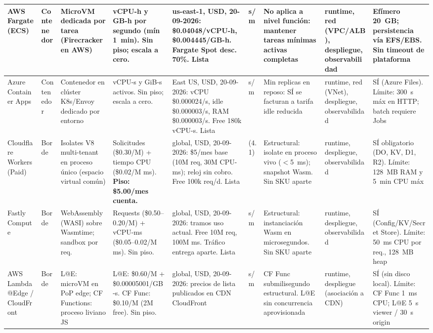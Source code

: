 \documentclass[12pt, letterpaper, table, xcdraw]{inf-pucv}
\begin{document}
\begin{landscape}
{\begin{longtable}{|p{2.1cm}|p{1.6cm}|p{2.4cm}|p{2.8cm}|p{3.1cm}|p{1.0cm}|p{2.1cm}|p{2.6cm}|p{2.8cm}|}
AWS Fargate (ECS) & Contenedor & MicroVM dedicada por tarea (Firecracker en AWS) & vCPU-h y GB-h por segundo (mín 1~min). Sin piso; escala a cero. & us-east-1, USD, 20-09-2026: \$0.04048/vCPU-h, \$0.004445/GB-h. Fargate Spot desc. 70\%. Lista & s/m & No aplica a nivel función: mantener tareas mínimas activas completas & runtime, red (VPC/ALB), despliegue, observabilidad & Efímero 20~GB; persistencia vía EFS/EBS. Sin timeout de plataforma \\ \hline

Azure Container Apps & Contenedor & Contenedor en clúster K8s/Envoy dedicado por entorno & vCPU-s y GiB-s activos. Sin piso; escala a cero. & East US, USD, 20-09-2026: vCPU \$0.000024/s, idle \$0.000003/s, RAM \$0.000003/s. Free 180k vCPU-s. Lista & s/m & Min replicas en reposo: SÍ se facturan a tarifa idle reducida & runtime, red (VNet), despliegue, observabilidad & SÍ (Azure Files). Límite: 300~s máx en HTTP; batch requiere Jobs \\ \hline

Cloudflare Workers (Paid) & Borde & Isolates V8 multi-tenant en proceso único (espacio virtual común) & Solicitudes (\$0.30/M) + tiempo CPU (\$0.02/M ms). \textbf{Piso: \$5.00/mes cuenta.} & global, USD, 20-09-2026: \$5/mes base (10M req, 30M CPU-ms); reloj sin cobro. Free 100k req/d. Lista & (4.1) & Estructural: isolate en proceso vivo ($<$5~ms); snapshot Wasm. Sin SKU aparte & runtime, despliegue, observabilidad & SÍ obligatorio (DO, KV, D1, R2). Límite: 128~MB RAM y 5~min CPU máx \\ \hline

Fastly Compute & Borde & WebAssembly (WASI) sobre Wasmtime; sandbox por req. & Requests (\$0.50--0.20/M) + vCPU-ms (\$0.05--0.02/M ms). Sin piso. & global, USD, 20-09-2026: tramos uso actual. Free 10M req, 100M ms. Tráfico entrega aparte. Lista & s/m & Estructural: instanciación Wasm en microsegundos. Sin SKU aparte & runtime, despliegue, observabilidad & SÍ (Config/KV/Secret Store). Límite: 50~ms CPU por req., 128~MB heap \\ \hline

AWS Lambda@Edge / CloudFront & Borde & L@E: microVM en PoP edge; CF Functions: proceso liviano JS & L@E: \$0.60/M + \$0.00005001/GB-s. CF Func: \$0.10/M (2M free). Sin piso. & global, USD, 20-09-2026: precios de lista publicados en CDN CloudFront & s/m & CF Func submilisegundo estructural. L@E sin concurrencia aprovisionada & runtime, despliegue (asociación a CDN) & SÍ (sin disco local). Límite: CF Func 1~ms CPU; L@E 5~s viewer / 30~s origin \\ \hline


\end{longtable}}
\end{landscape}
\end{document}
